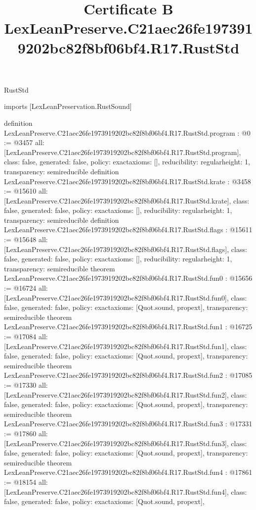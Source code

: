 \begin{lexlean}{RustStd}
\title{Certificate B LexLeanPreserve.C21aec26fe1973919202bc82f8bf06bf4.R17.RustStd}
\begin{coremodule}
imports [LexLeanPreservation.RustSound]

definition LexLeanPreserve.C21aec26fe1973919202bc82f8bf06bf4.R17.RustStd.program : @0 := @3457 {
  all: [LexLeanPreserve.C21aec26fe1973919202bc82f8bf06bf4.R17.RustStd.program],
  class: false,
  generated: false,
  policy: exact{axioms: []},
  reducibility: regular{height: 1},
  transparency: semireducible
}
definition LexLeanPreserve.C21aec26fe1973919202bc82f8bf06bf4.R17.RustStd.krate : @3458 := @15610 {
  all: [LexLeanPreserve.C21aec26fe1973919202bc82f8bf06bf4.R17.RustStd.krate],
  class: false,
  generated: false,
  policy: exact{axioms: []},
  reducibility: regular{height: 1},
  transparency: semireducible
}
definition LexLeanPreserve.C21aec26fe1973919202bc82f8bf06bf4.R17.RustStd.flags : @15611 := @15648 {
  all: [LexLeanPreserve.C21aec26fe1973919202bc82f8bf06bf4.R17.RustStd.flags],
  class: false,
  generated: false,
  policy: exact{axioms: []},
  reducibility: regular{height: 1},
  transparency: semireducible
}
theorem LexLeanPreserve.C21aec26fe1973919202bc82f8bf06bf4.R17.RustStd.fun0 : @15656 := @16724 {
  all: [LexLeanPreserve.C21aec26fe1973919202bc82f8bf06bf4.R17.RustStd.fun0],
  class: false,
  generated: false,
  policy: exact{axioms: [Quot.sound, propext]},
  transparency: semireducible
}
theorem LexLeanPreserve.C21aec26fe1973919202bc82f8bf06bf4.R17.RustStd.fun1 : @16725 := @17084 {
  all: [LexLeanPreserve.C21aec26fe1973919202bc82f8bf06bf4.R17.RustStd.fun1],
  class: false,
  generated: false,
  policy: exact{axioms: [Quot.sound, propext]},
  transparency: semireducible
}
theorem LexLeanPreserve.C21aec26fe1973919202bc82f8bf06bf4.R17.RustStd.fun2 : @17085 := @17330 {
  all: [LexLeanPreserve.C21aec26fe1973919202bc82f8bf06bf4.R17.RustStd.fun2],
  class: false,
  generated: false,
  policy: exact{axioms: [Quot.sound, propext]},
  transparency: semireducible
}
theorem LexLeanPreserve.C21aec26fe1973919202bc82f8bf06bf4.R17.RustStd.fun3 : @17331 := @17860 {
  all: [LexLeanPreserve.C21aec26fe1973919202bc82f8bf06bf4.R17.RustStd.fun3],
  class: false,
  generated: false,
  policy: exact{axioms: [Quot.sound, propext]},
  transparency: semireducible
}
theorem LexLeanPreserve.C21aec26fe1973919202bc82f8bf06bf4.R17.RustStd.fun4 : @17861 := @18154 {
  all: [LexLeanPreserve.C21aec26fe1973919202bc82f8bf06bf4.R17.RustStd.fun4],
  class: false,
  generated: false,
  policy: exact{axioms: [Quot.sound, propext]},
}
\end{coremodule}
\end{lexlean}
